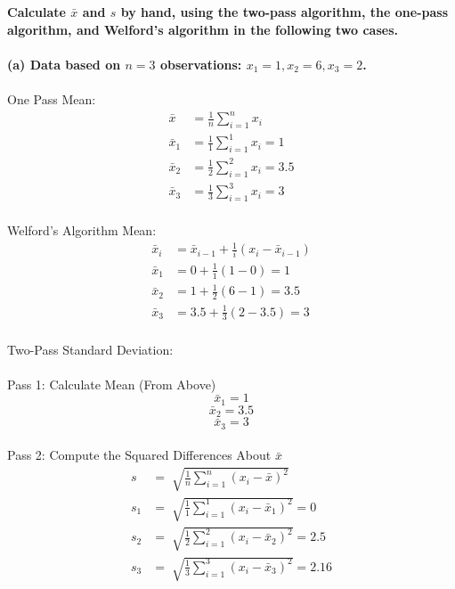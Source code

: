 \textbf{Calculate $\bar{x}$ and $s$ by hand, using the two-pass algorithm, the one-pass algorithm, and Welford's algorithm in the following two cases.}\\\\

\noindent \textbf{(a) Data based on $n=3$ observations: $x_1=1,x_2=6,x_3=2$.} \\\\

One Pass Mean: \\
\begin{align*}
    \bar{x}&=\frac{1}{n}\sum_{i=1}^{n}x_i\\
    \bar{x}_1&=\frac{1}{1}\sum_{i=1}^{1}x_i = 1\\
    \bar{x}_2&=\frac{1}{2}\sum_{i=1}^{2}x_i=3.5\\
    \bar{x}_3&=\frac{1}{3}\sum_{i=1}^{3}x_i = 3\\
\end{align*}

Welford's Algorithm Mean: \\
\begin{align*}
    \bar{x}_i &= \bar{x}_{i-1}+\frac{1}{i}(x_i-\bar{x}_{i-1})\\
    \bar{x}_1 &= 0+\frac{1}{1}(1-0)=1\\
    \bar{x}_2 &= 1+\frac{1}{2}(6-1)=3.5\\
    \bar{x}_3 &= 3.5+\frac{1}{3}(2-3.5)=3\\
\end{align*}

\newpage
Two-Pass Standard Deviation: \\\\
\indent\indent Pass 1: Calculate Mean (From Above)\\
$$\bar{x}_1=1$$
$$\bar{x}_2=3.5$$
$$\bar{x}_3=3$$\\

\indent\indent Pass 2: Compute the Squared Differences About $\bar{x}$ \\
\begin{align*}
    s&=\sqrt[]{\frac{1}{n}\sum_{i=1}^{n}(x_i - \bar{x})^2}\\
    s_1&=\sqrt[]{\frac{1}{1}\sum_{i=1}^{1}(x_i - \bar{x}_1)^2}=0\\
    s_2&=\sqrt[]{\frac{1}{2}\sum_{i=1}^{2}(x_i - \bar{x}_2)^2}=2.5\\
    s_3&=\sqrt[]{\frac{1}{3}\sum_{i=1}^{3}(x_i - \bar{x}_3)^2}=2.16\\
\end{align*}

